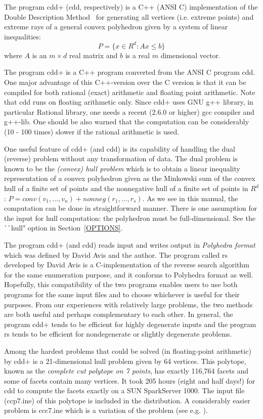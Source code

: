 The program  cdd+  (cdd, respectively)   is 
a C++  (ANSI C) implementation of 
the Double Description Method~\cite{MRTT}
for generating all vertices (i.e. extreme points)
and extreme rays of a general 
convex polyhedron given by a system of linear inequalities:
\[
   P = \{ x  \in R^d:  A  x  \le  b \}
\]
where $A$ is an $m \times d$ real matrix and $b$ is a real
$m$ dimensional vector.

The program cdd+ is a C++ program converted from the ANSI C
program cdd.  One major advantage of this C++-version over the C version is
that it can be compiled for both rational (exact) arithmetic and 
floating point arithmetic.  Note that cdd runs on floating
arithmetic only.  Since cdd+ uses GNU g++ library, in particular 
Rational library, one needs a recent (2.6.0 or higher) gcc compiler
and g++-lib.  One should be also warned that the computation
can be considerably  (10 - 100 times) slower if the rational
arithmetic is used.

One useful feature of  cdd+ (and cdd) is its capability
of handling the dual (reverse)  problem without any transformation
of data.  The dual problem is known to be the 
{\em (convex) hull problem\/} which
is to obtain a linear inequality representation
of a convex polyhedron given as the Minkowski sum of 
the convex hull of a finite set of points and the nonnegative
hull of a finite set of points in $R^d$: 
$P = conv(v_1,\ldots,v_n) +  nonneg(r_1,\ldots,r_s)$.
As we see in this manual, the computation can be done
in straightforward manner.  There is one assumption for the input
for hull computation: the polyhedron must be full-dimensional.
See the ^^ ^^ hull" option in Section~\ref{OPTIONS}.

The program cdd+ (and cdd) reads input and writes output in 
{\em Polyhedra format\/} which was defined by David Avis and
the author.  The program called rs developed by David Avis is
a C-implementation of the reverse search algorithm~\cite{AF} 
for the same enumeration purpose, and it conforms to Polyhedra format as well.
Hopefully, this compatibility of the two programs
enables users to use both programs for the same input files
and to choose whichever is useful for their purposes.
From our experiences with relatively large problems,
the two methods are both useful and perhaps complementary
to each other.  In general, the program cdd+ tends to be
efficient for highly degenerate inputs and the program rs
tends to be efficient for nondegenerate or slightly
degenerate problems.

Among the hardest problems that could be
solved (in floating-point arithmetic) by cdd+ is a 21-dimensional hull problem given by 64 
vertices. This polytope, known as the {\em complete
cut polytope on 7 points\/}, has exactly 116,764 facets
and some of facets contain many vertices. 
It took 205 hours (eight and half days!) for cdd
to compute the facets exactly on a SUN SparkServer 1000.
The input file (ccp7.ine) of this polytope is
included in the distribution.  A considerably easier
problem is ccc7.ine which is a variation of the problem 
(see e.g. \cite{G}).

